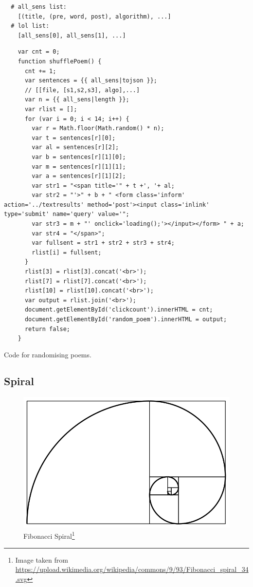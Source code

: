 
\begin{verbatim}
  # all_sens list:
    [(title, (pre, word, post), algorithm), ...]
  # lol list:
    [all_sens[0], all_sens[1], ...]
\end{verbatim}


\begin{listing}[h!]
  \begin{verbatim}
    var cnt = 0;
    function shufflePoem() {
      cnt += 1;
      var sentences = {{ all_sens|tojson }};
      // [[file, [s1,s2,s3], algo],...]
      var n = {{ all_sens|length }};
      var rlist = [];
      for (var i = 0; i < 14; i++) {
        var r = Math.floor(Math.random() * n);
        var t = sentences[r][0];
        var al = sentences[r][2];
        var b = sentences[r][1][0];
        var m = sentences[r][1][1];
        var a = sentences[r][1][2];
        var str1 = "<span title='" + t +', '+ al;
        var str2 = "'>" + b + " <form class='inform' action='../textresults' method='post'><input class='inlink' type='submit' name='query' value='";
        var str3 = m + "' onclick='loading();'></input></form> " + a;
        var str4 = "</span>";
        var fullsent = str1 + str2 + str3 + str4;
        rlist[i] = fullsent;
      }
      rlist[3] = rlist[3].concat('<br>');
      rlist[7] = rlist[7].concat('<br>');
      rlist[10] = rlist[10].concat('<br>');
      var output = rlist.join('<br>');
      document.getElementById('clickcount').innerHTML = cnt;
      document.getElementById('random_poem').innerHTML = output;
      return false;
    }
  \end{verbatim}
\caption{Code for randomising poems.}
\label{code:rpoemsjs}
\end{listing}


\subsection{Spiral}

\begin{figure}[!htbp] %
  \centering
  \includegraphics[width=0.5\linewidth]{images/Fibonacci}
\caption[Fibonacci Spiral]{Fibonacci Spiral\footnote{Image taken from \url{https://upload.wikimedia.org/wikipedia/commons/9/93/Fibonacci_spiral_34.svg}}}
\label{img:Fibonacci}
\end{figure}


